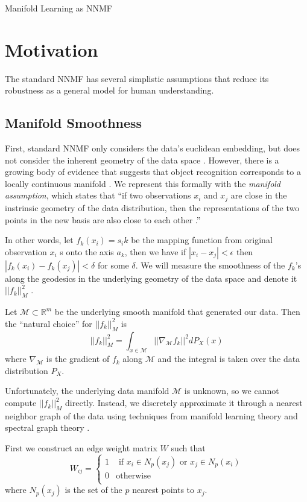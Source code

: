 \documentclass[12pt]{pom_thesis}
\begin{document}
\begin{chapter}{Manifold Learning as NNMF}
	\label{supervised}
	
	\section{Motivation}
	The standard NNMF has several simplistic assumptions that reduce its  robustness as a general model for human understanding. 

	\subsection*{Manifold Smoothness}
	First, standard NNMF only considers the data's euclidean embedding, but does not consider the inherent geometry of the data space \cite{cai2008non}. However, there is a growing body of evidence that suggests that object recognition corresponds to a locally continuous manifold \cite{dicarlo2012does}. We represent this formally with the \textit{manifold assumption}, which states that ``if two observations $x_i$ and $x_j$ are close in the instrinsic geometry of the data distribution, then the representations of the two points in the new basis are also close to each other \cite{belkin2001laplacian, cai2008non}.''
	
	In other words, let  $f_k(x_i) = s_ik$ be the mapping function from original observation $x_i$ s onto the axis $a_k$, then we have if $|x_i - x_j| < \epsilon$ then $|f_k(x_i) - f_k(x_j) | < \delta$ for some $\delta$. We will measure the smoothness of the $f_k$'s along the geodesics in the underlying geometry of the data space and denote it $||f_k||^2_M$ \cite{cai2008non}. 
	
	Let $\mathcal{M} \subset \mathbb{R}^m$ be the underlying smooth manifold that generated our data. Then the ``natural choice'' for $||f_k||^2_M$ is 
	$$||f_k||^2_M = \int_{x \in \mathcal{M}} ||\nabla_\mathcal{M} f_k||^2 dP_X(x)$$
	where $\nabla_\mathcal{M}$ is the gradient of $f_k$ along $\mathcal{M}$ and the integral is taken over the data distribution $P_X$.
	
	Unfortunately, the underlying data manifold $\mathcal{M}$ is unknown, so we cannot compute $||f_k||^2_M$ directly. Instead, we discretely approximate it through a nearest neighbor graph of the data using techniques from manifold learning theory \cite{belkin2003problems} and spectral graph theory \cite{chung1997spectral}. 
	
	First we construct an edge weight matrix $W$ such that
	 $$W_{ij} = \begin{cases} 
	1 & \textrm{ if $x_i \in N_p(x_j)$ or $x_j \in N_p(x_i)$} \\
	0 & \text{otherwise} \\
	\end{cases} $$
	where $N_p(x_j)$ is the set of the $p$ nearest points to $x_j$.
	

\end{chapter}
\end{document}
